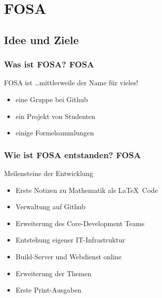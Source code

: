 \section{FOSA}

\subsection{Idee und Ziele}
\begin{frame}
	\frametitle{Was ist FOSA? \hfill{} \footnotesize{FOSA}}
	\begin{block}{FOSA ist \dots mittlerweile der Name für vieles!}
		\begin{itemize}
			\item eine Gruppe bei Github
			\item ein Projekt von Studenten
			\item einige Formelsammlungen 
		\end{itemize}
	\end{block}
\end{frame}

\begin{frame}
	\frametitle{Wie ist FOSA entstanden? \hfill{} \footnotesize{FOSA}}
	\begin{block}{Meilensteine der Entwicklung}
		\begin{itemize}
			\item Erste Notizen zu Mathematik als \LaTeX~Code
			\item Verwaltung auf Github
			\item Erweiterung des Core-Development Teams
			\item Entstehung eigener IT-Infrastruktur
			\item Build-Server und Webdienst online
			\item Erweiterung der Themen
			\item Erste Print-Ausgaben
		\end{itemize}
	\end{block}
\end{frame}

